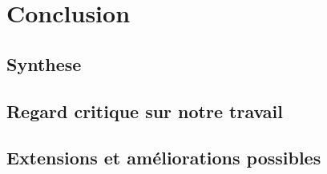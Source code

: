 \documentclass[a4paper, 10pt]{article}
\begin{document}
\newpage
\section{Conclusion}

\subsection{Synthese}

\subsection{Regard critique sur notre travail}

\subsection{Extensions et améliorations possibles}
\end{document}
